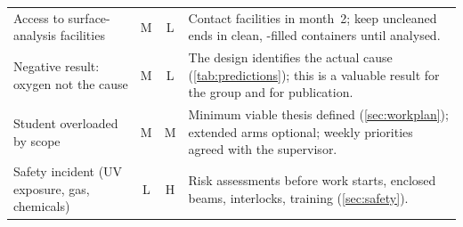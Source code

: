\begin{longtable}{@{}L{4.4cm} c c L{8.0cm}@{}}
Access to surface-analysis facilities & M & L &
Contact facilities in month~2; keep uncleaned ends in clean, \Ntwo{}-filled containers until analysed. \\
Negative result: oxygen not the cause & M & L &
The design identifies the actual cause (\cref{tab:predictions}); this is a valuable result for the group
and for publication. \\
Student overloaded by scope & M & M &
Minimum viable thesis defined (\cref{sec:workplan}); extended arms optional; weekly priorities agreed
with the supervisor. \\
Safety incident (UV exposure, gas, chemicals) & L & H &
Risk assessments before work starts, enclosed beams, interlocks, training (\cref{sec:safety}). \\
\end{longtable}
